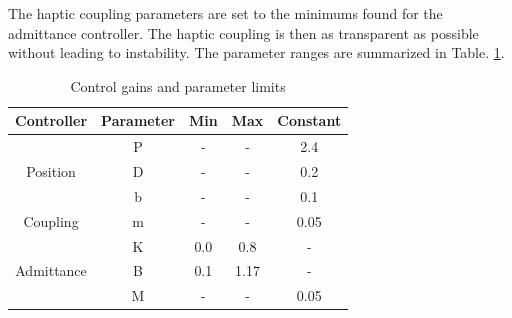 \documentclass[12pt]{report}
\begin{document}
	The haptic coupling parameters are set to the minimums found for the admittance controller. The haptic coupling is then as transparent as possible without leading to instability. The parameter ranges are summarized in Table. \ref{tab:params}. 
	
		
	\begin{table}[h] \label{tab:params}
	\centering
	\caption{Control gains and parameter limits}
	\begin{tabular}{c c c c c }
	\toprule
	Controller & Parameter & Min & Max & Constant  \\
	\midrule
	\rowcolor{gray!10} \cellcolor{white} & P & - & -  & 2.4  \\
	\multirow{-2}{*}{Position} \cellcolor{white} & D & - & - & 0.2 \\
	\midrule
	\rowcolor{gray!10} \cellcolor{white} & b & -  & -  & 0.1  \\
	\multirow{-2}{*}{Coupling} \cellcolor{white} & m & -  & -  & 0.05  \\
	\midrule
	\rowcolor{gray!10} \cellcolor{white} & K & 0.0 & 0.8  &  - \\
	\multirow{-1}{*}{Admittance} \cellcolor{white} & B & 0.1 & 1.17  & - \\
	\rowcolor{gray!10} \cellcolor{white} & M & - & -  & 0.05  \\
	\bottomrule
	\end{tabular}
	\end{table}	
	
	
			
\end{document}
